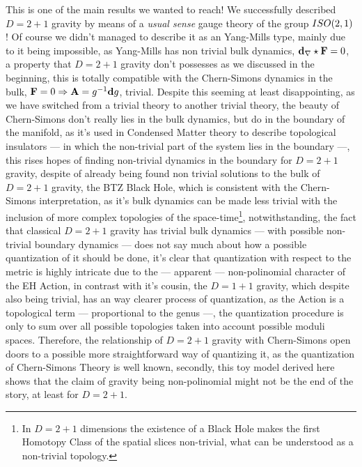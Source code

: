 This is one of the main results we wanted to reach! We successfully described $D=2+1$ gravity by means of a \textit{usual sense} gauge theory of the group $ISO\qty(2,1)$! Of course we didn't managed to describe it as an Yang-Mills type, mainly due to it being impossible, as Yang-Mills has 
non trivial bulk dynamics, $\vb d_\nabla\star\vb F=0$, a property that $D=2+1$ gravity don't possesses as we discussed in the beginning, this is totally compatible with the Chern-Simons dynamics in the bulk, $\vb F=0\Rightarrow\vb A=g^{-1}\vb d g$, trivial. Despite this seeming at least disappointing, 
as we have switched from a trivial theory to another trivial theory, the beauty of Chern-Simons don't really lies in the bulk dynamics, but do in the boundary of the manifold, as it's used in 
Condensed Matter theory to describe topological insulators --- in which the non-trivial part of the system lies in the boundary ---, this rises hopes of finding non-trivial dynamics in the boundary for $D=2+1$ gravity, despite of 
already being found non trivial solutions to the bulk of $D=2+1$ gravity, the BTZ Black Hole, which is consistent with the Chern-Simons interpretation, as it's bulk dynamics can be made less trivial with the inclusion of more complex topologies 
of the space-time\footnote{In $D=2+1$ dimensions the existence of a Black Hole makes the first Homotopy Class of the spatial slices non-trivial, what can be understood as a non-trivial topology.}, notwithstanding, the fact that classical $D=2+1$ gravity has trivial bulk dynamics --- with possible non-trivial boundary dynamics --- does not say much about how a possible quantization of it should be done, 
it's clear that quantization with respect to the metric is highly intricate due to the --- apparent --- non-polinomial character of the EH Action, in contrast with it's cousin, the $D=1+1$ gravity, which despite also being trivial, has an 
way clearer process of quantization, as the Action is a topological term --- proportional to the genus ---, the quantization procedure is only to sum over all possible topologies taken into account possible moduli spaces. Therefore, the relationship of 
$D=2+1$ gravity with Chern-Simons open doors to a possible more straightforward way of quantizing it, as the quantization of Chern-Simons Theory is well known, secondly, this toy model derived here shows that the claim 
of gravity being non-polinomial might not be the end of the story, at least for $D=2+1$.

